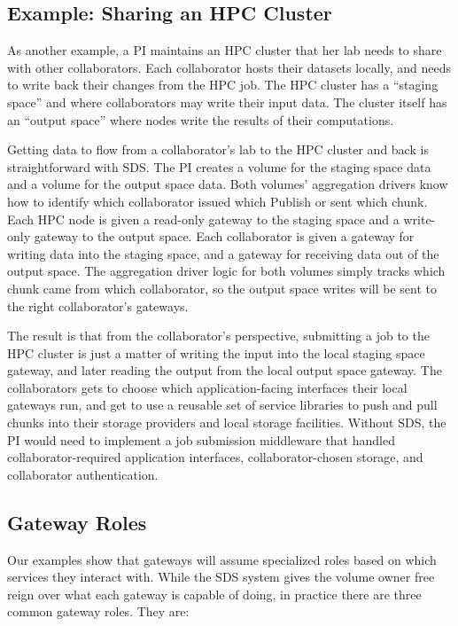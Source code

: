 {\subsection{Example: Sharing an HPC Cluster}

As another example, a PI maintains an HPC cluster that her lab needs to share
with other collaborators.  Each collaborator hosts their datasets locally, and
needs to write back their changes from the HPC job.  The HPC cluster has a
``staging space'' and where collaborators may write their input data.  The
cluster itself has an ``output space'' where nodes write the results of their
computations.

Getting data to flow from a collaborator's lab to the HPC cluster and back is
straightforward with SDS.  The PI creates a volume for the staging space data
and a volume for the output space data.  Both volumes' aggregation drivers know
how to identify which collaborator issued which Publish or sent which chunk.
Each HPC node is given a read-only gateway to the staging space and a write-only
gateway to the output space.  Each collaborator is given a gateway for writing
data into the staging space, and a gateway for receiving data out of the output
space.  The aggregation driver logic for both volumes simply tracks which chunk
came from which collaborator, so the output space writes will be sent to the
right collaborator's gateways.

The result is that from the collaborator's perspective, submitting a job to the HPC
cluster is just a matter of writing the input into the local staging space
gateway, and later reading the output from the local output space gateway.  The
collaborators gets to choose which application-facing interfaces their local
gateways run, and get to use a reusable set of service libraries to push and pull
chunks into their storage providers and local storage facilities.
Without SDS, the PI would need to implement a job submission middleware that
handled collaborator-required application interfaces, collaborator-chosen
storage, and collaborator authentication.

\subsection{Gateway Roles}

Our examples show that gateways will assume specialized roles based on
which services they interact with.
While the SDS system gives the volume owner free reign over what each gateway is
capable of doing, in practice there are three common gateway roles.
They are:

}
